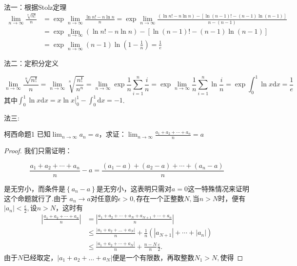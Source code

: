 \begin{xiti}
\begin{solution}
\begin{enumerate}
		法一：根据Stolz定理
		\begin{equation*}
		\begin{aligned}
		\lim _{n \rightarrow \infty} \frac{\sqrt[n]{n !}}{n}&=\exp\lim _{n \rightarrow \infty}\frac{\ln n!-n\ln n}{n}=\exp{\lim_{n \rightarrow \infty}\frac{(\ln n!-n\ln n)-[\ln(n-1)!-(n-1)\ln(n-1)]}{n-(n-1)}}\\
		&=\exp{\lim_{n \rightarrow \infty}{(\ln n!-n\ln n)-[\ln(n-1)!-(n-1)\ln(n-1)]}}\\
		&=\exp{\lim_{n \rightarrow \infty}(n-1)\ln(1-\frac{1}{n})}=\frac{1}{e}
		\end{aligned}
		\end{equation*}
		
		法二：定积分定义
		
		\[
		\lim _{n \rightarrow \infty} \frac{\sqrt[n]{n !}}{n}=\lim _{n \rightarrow \infty} \sqrt[n]{\frac{n !}{n^{n}}}=\lim _{n \rightarrow \infty} \exp{\frac{1}{n} \sum_{i=1}^{n} \frac{i}{n}}=\exp{\lim _{n \rightarrow \infty} \frac{1}{n} \sum_{i=1}^{n} \ln \frac{i}{n}}=\exp\int_{0}^{1} \ln x \mathrm{d} x=\frac{1}{e}
		\]
		其中$\int_{0}^{1} \ln x \mathrm{d} x=x \ln \left.x\right|_{0} ^{1}-\int_{0}^{1} \mathrm{d} x=-1$.
		
		法三:
		\begin{theorem}{柯西命题}{1}
			已知$\lim_{n \rightarrow \infty}a_n=a$，求证：$\lim_{n\rightarrow\infty}\frac{a_1+a_2+\cdots +a_n}{n}=a$
		\end{theorem}
			\begin{proof}
			我们只需证明：
			
			\[\frac{a_{1}+a_{2}+\cdots+a_{n}}{n}-a=\frac{\left(a_{1}-a\right)+\left(a_{2}-a\right)+\cdots+\left(a_{n}-a\right)}{n}\]
			
			是无穷小，而条件是$\left\{a_n-a\right\}$是无穷小，这表明只需对$a=0$这一特殊情况来证明这个命题就行了.由于 $a_n \rightarrow a$对任意的$\epsilon>0,$存在一个正整数$N,$当$n>N$时，便有$|a_n|<\frac{\epsilon}{2},$设$n>N$，这时有
			\begin{align*}
			\left|\frac{a_{1}+a_{2}+\cdots+a_{n}}{n}\right|&=\left|\frac{a_{1}+a_{2}+\cdots+a_{N}+a_{N+1}+\cdots+a_{n}}{n}\right|\\
			&\leqslant \frac{\left|a_{1}+a_{2}+\dots+a_{N}\right|}{n}+\frac{1}{n}\left(\left|a_{N+1}\right|+\cdots+\left|a_{n}\right|\right)\\
			&\leqslant \frac{\left|a_{1}+a_{2}+\cdots+a_{N}\right|}{n}+\frac{n-N}{n} \frac{\varepsilon}{2}.
			\end{align*}
			由于$N$已经取定，$\left|a_{1}+a_{2}+\dots+a_{N}\right|$便是一个有限数，再取整数$N_1>N,$使得
			

\end{proof}
\end{enumerate}
\end{solution}
\end{xiti}
